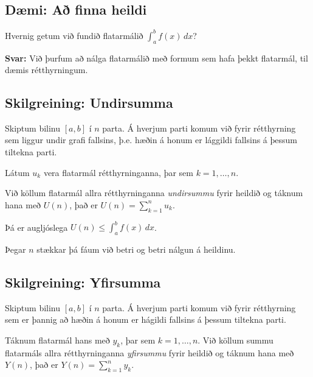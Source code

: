 \documentclass[a4paper,10pt,icelandic]{sphinxmanual}
\begin{document}
\subsection{Dæmi: Að finna heildi}
\label{kafli06:daemi-a-finna-heildi}
Hvernig getum við fundið flatarmálið \(\int_a^b f(x)\, dx\)?

\textbf{Svar:} Við þurfum að nálga flatarmálið með formum sem hafa þekkt
flatarmál, til dæmis rétthyrningum.


\subsection{Skilgreining: Undirsumma}
\label{kafli06:skilgreining-undirsumma}\label{kafli06:index-1}
Skiptum bilinu \([a,b]\) í \(n\) parta. Á hverjum parti komum
við fyrir rétthyrning sem liggur undir grafi fallsins, þ.e. hæðin á
honum er lággildi fallsins á þessum tiltekna parti.


Látum \(u_k\) vera flatarmál rétthyrninganna, þar sem
\(k=1,\ldots,n\).

Við köllum flatarmál allra rétthyrninganna \textit{undirsummu} fyrir heildið og
táknum hana með \(U(n)\), það er \(U(n) = \sum_{k=1}^n u_k\).

Þá er augljóslega \(U(n) \leq \int_a^b f(x)\, dx\).

Þegar \(n\) stækkar þá fáum við betri og betri nálgun á heildinu.


\subsection{Skilgreining: Yfirsumma}
\label{kafli06:skilgreining-yfirsumma}\label{kafli06:index-2}
Skiptum bilinu \([a,b]\) í \(n\) parta. Á hverjum parti komum
við fyrir rétthyrning sem er þannig að hæðin á honum er hágildi fallsins
á þessum tiltekna parti.


Táknum flatarmál hans með \(y_k\), þar sem \(k=1,\ldots,n\). Við
köllum summu flatarmáls allra rétthyrninganna \textit{yfirsummu} fyrir heildið
og táknum hana með \(Y(n)\), það er \(Y(n) = \sum_{k=1}^n y_k\).
\end{document}
